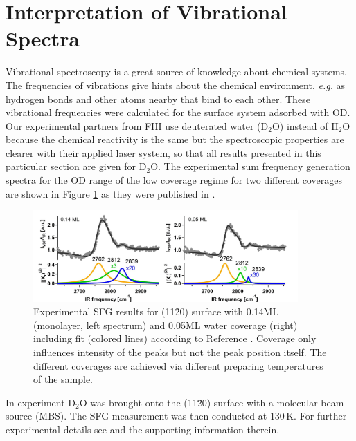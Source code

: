 \documentclass[11pt,DIV=13,BCOR=5mm,a4paper,headinclude]{scrbook}
\begin{document}
\clearpage
\section{Interpretation of Vibrational Spectra}\label{sec:vib11-20}

Vibrational spectroscopy is a great source of knowledge about chemical systems.
The frequencies of vibrations give hints about the chemical environment, \textit{e.g.} as hydrogen bonds and other atoms nearby that bind to each other.
These vibrational frequencies were calculated for the surface system adsorbed with OD.
Our experimental partners from FHI use deuterated water (D$_2$O) instead of H$_2$O because the chemical reactivity is the same but the spectroscopic properties are clearer with their applied laser system, so that all results presented in this particular section are given for D$_2$O.
The experimental sum frequency generation spectra for the OD range of the low coverage regime for two different coverages are shown in Figure \ref{abb:exp-sfg} as they were published in \cite{Heiden11-20_2018}.
\begin{figure}[!h]
 \centering
\includegraphics[width=0.9\textwidth]{figures/11-20/SFG_fit.jpg}
 \caption{Experimental SFG results for (11\=20) surface with 0.14ML (monolayer, left spectrum) and 0.05ML water coverage (right) including fit (colored lines) according to Reference \cite{Heiden11-20_2018}.
 Coverage only influences intensity of the peaks but not the peak position itself.
The different coverages are achieved via different preparing temperatures of the sample.}
        \label{abb:exp-sfg}
 \end{figure}


In experiment D$_2$O was brought onto the (11\=20) surface with a molecular beam source (MBS).
The SFG measurement was then conducted at $130\,$K.
For further experimental details see \cite{Heiden11-20_2018} and the supporting information therein.
\\
\\
\end{document}
